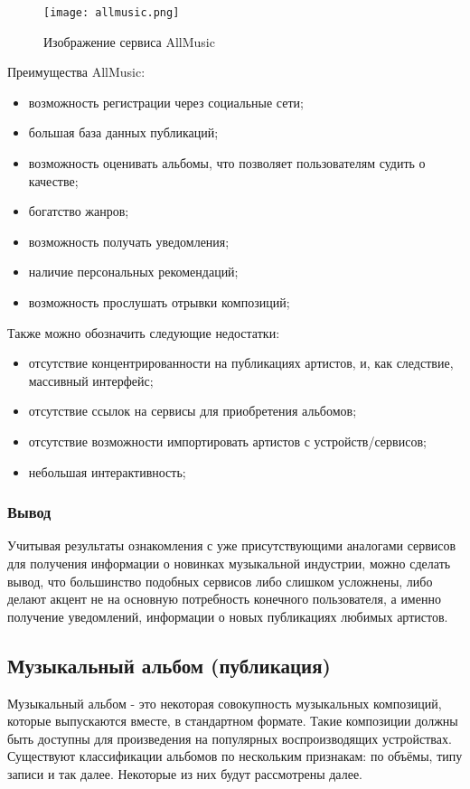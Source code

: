 \begin{figure}[ht]
\centering
  \texttt{[image: allmusic.png]}
  \caption{ Изображение сервиса AllMusic }
  \label{fig:domain:allmusic:picture}
\end{figure}

Преимущества AllMusic:

\begin{itemize}
  \item возможность регистрации через социальные сети;
  \item большая база данных публикаций;
  \item возможность оценивать альбомы, что позволяет пользователям судить о качестве;
  \item богатство жанров;
  \item возможность получать уведомления;
  \item наличие персональных рекомендаций;
  \item возможность прослушать отрывки композиций;
\end{itemize}

Также можно обозначить следующие недостатки:

\begin{itemize}
  \item отсутствие концентрированности на публикациях артистов, и, как следствие, массивный интерфейс;
  \item отсутствие ссылок на сервисы для приобретения альбомов;
  \item отсутствие возможности импортировать артистов с устройств/сервисов;
  \item небольшая интерактивность;
\end{itemize}

\subsubsection{Вывод}
\label{sub:domain:analogues_review:conclusion}
Учитывая результаты ознакомления с уже присутствующими аналогами сервисов для получения информации о новинках музыкальной индустрии, можно сделать вывод, что большинство подобных сервисов либо слишком усложнены, либо делают акцент не на основную потребность конечного пользователя, а именно получение уведомлений, информации о новых публикациях любимых артистов.

\subsection{Музыкальный альбом (публикация)}
\label{sub:domain:music_album}
Музыкальный альбом - это некоторая совокупность музыкальных композиций, которые выпускаются вместе, в стандартном формате. Такие композиции должны быть доступны для произведения на популярных воспроизводящих устройствах.
Существуют классификации альбомов по нескольким признакам: по объёмы, типу записи и так далее. Некоторые из них будут рассмотрены далее.

